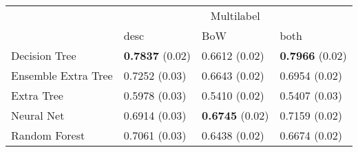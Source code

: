 \begin{tabular}{|l|l|l|l| }
\hline
 &  \multicolumn{3}{c|}{Multilabel} \\
\cline{2-4} & desc & BoW & both \\ \hline
Decision Tree       & {\bf 0.7837} (0.02) & 0.6612 (0.02) & {\bf 0.7966} (0.02)\\
Ensemble Extra Tree & 0.7252 (0.03) & 0.6643 (0.02) & 0.6954 (0.02)\\
Extra Tree          & 0.5978 (0.03) & 0.5410 (0.02) & 0.5407 (0.03)\\
Neural Net          & 0.6914 (0.03) & {\bf 0.6745} (0.02) & 0.7159 (0.02)\\
Random Forest       & 0.7061 (0.03) & 0.6438 (0.02) & 0.6674 (0.02)\\
\hline
\end{tabular}